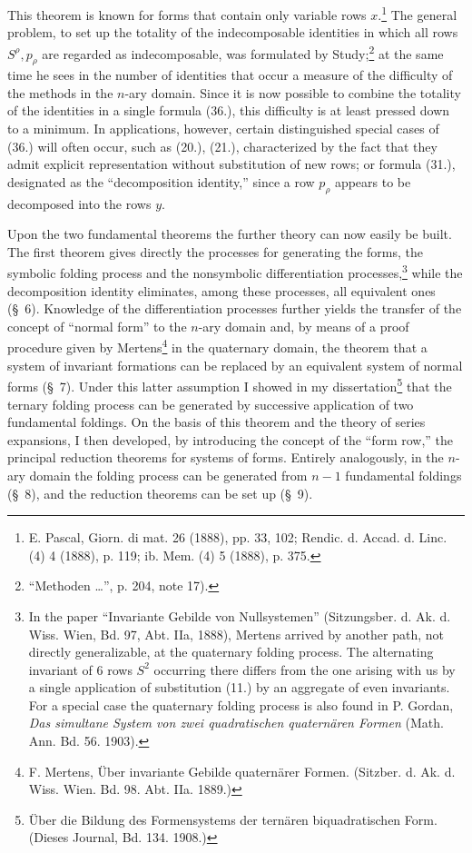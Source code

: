 \documentclass[11pt]{article}
\begin{document}
This theorem is known for forms that contain only variable rows $x$.\footnote{E. Pascal, Giorn. di mat. 26 (1888), pp. 33, 102; Rendic. d. Accad. d. Linc. (4) 4 (1888), p. 119; ib. Mem. (4) 5 (1888), p. 375.} The general problem, to set up the totality of the indecomposable identities in which all rows $S^\rho,p_\rho$ are regarded as indecomposable, was formulated by Study;\footnote{``Methoden \dots'', p. 204, note 17).} at the same time he sees in the number of identities that occur a measure of the difficulty of the methods in the $n$-ary domain. Since it is now possible to combine the totality of the identities in a single formula (36.), this difficulty is at least pressed down to a minimum. In applications, however, certain distinguished special cases of (36.) will often occur, such as (20.), (21.), characterized by the fact that they admit explicit representation without substitution of new rows; or formula (31.), designated as the ``decomposition identity,'' since a row $p_\rho$ appears to be decomposed into the rows $y$.

Upon the two fundamental theorems the further theory can now easily be built. The first theorem gives directly the processes for generating the forms, the symbolic folding process and the nonsymbolic differentiation processes,\footnote{In the paper ``Invariante Gebilde von Nullsystemen'' (Sitzungsber. d. Ak. d. Wiss. Wien, Bd. 97, Abt. IIa, 1888), Mertens arrived by another path, not directly generalizable, at the quaternary folding process. The alternating invariant of 6 rows $S^2$ occurring there differs from the one arising with us by a single application of substitution (11.) by an aggregate of even invariants. For a special case the quaternary folding process is also found in P. Gordan, \emph{Das simultane System von zwei quadratischen quaternären Formen} (Math. Ann. Bd. 56. 1903).} while the decomposition identity eliminates, among these processes, all equivalent ones (\S\ 6). Knowledge of the differentiation processes further yields the transfer of the concept of ``normal form'' to the $n$-ary domain and, by means of a proof procedure given by Mertens\footnote{F. Mertens, Über invariante Gebilde quaternärer Formen. (Sitzber. d. Ak. d. Wiss. Wien. Bd. 98. Abt. IIa. 1889.)} in the quaternary domain, the theorem that a system of invariant formations can be replaced by an equivalent system of normal forms (\S\ 7). Under this latter assumption I showed in my dissertation\footnote{Über die Bildung des Formensystems der ternären biquadratischen Form. (Dieses Journal, Bd. 134. 1908.)} that the ternary folding process can be generated by successive application of two fundamental foldings. On the basis of this theorem and the theory of series expansions, I then developed, by introducing the concept of the ``form row,'' the principal reduction theorems for systems of forms. Entirely analogously, in the $n$-ary domain the folding process can be generated from $n-1$ fundamental foldings (\S\ 8), and the reduction theorems can be set up (\S\ 9).
\end{document}
